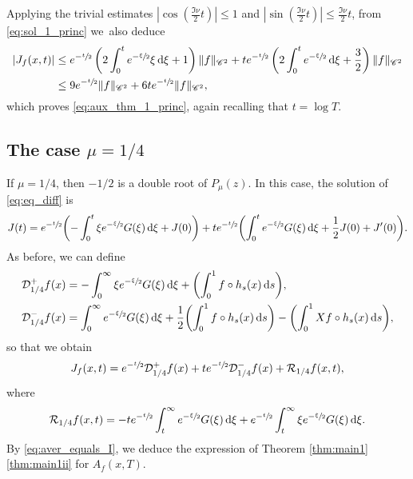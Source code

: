 \documentclass[JEP,XML,SOM,NoEqCountersInSection,Unicode,published]{cedram}
\newcommand*{\diff}{\mathop{}\!\mathrm{d}}
\newcommand{\aver}[1]{A_{#1}(x,T)}
\theoremstyle{definition}
\begin{document}
Applying the trivial estimates $|\cos(\frac{\Im\nu}{2} t)|\leq 1$ and $|\sin(\frac{\Im\nu}{2} t)|\leq \frac{\Im\nu}{2} t$, from \eqref{eq:sol_1_princ} we~also deduce
\begin{equation*}
\begin{split}
|J_f(x,t)|&\leq e^{-\sfrac{t}{2}} \left(2 \int_0^t e^{-\sfrac{\xi}{2}} \xi \diff \xi +1\right) \|f\|_{\mathscr{C}^2} + t e^{-\sfrac{t}{2}} \left(2 \int_0^t e^{-\sfrac{\xi}{2}} \diff \xi +\frac{3}{2}\right) \|f\|_{\mathscr{C}^2}\\
& \leq 9 e^{-\sfrac{t}{2}} \|f\|_{\mathscr{C}^2} + 6t e^{-\sfrac{t}{2}} \|f\|_{\mathscr{C}^2},
\end{split}
\end{equation*}
which proves \eqref{eq:aux_thm_1_princ}, again recalling that $t = \log T$.

\subsection{The case $\mu = 1/4$}\label{sec:14}

If $\mu = 1/4$, then $-1/2$ is a double root of $P_\mu(z)$. In this case, the solution of \eqref{eq:eq_diff} is
\begin{equation*}
J(t) = e^{-\sfrac{t}{2}} \biggl(- \int_0^t \xi e^{-\sfrac{\xi}{2}} G(\xi) \diff \xi + J(0) \biggr) + t e^{-\sfrac{t}{2}} \biggl(\int_0^t e^{-\sfrac{\xi}{2}} G(\xi) \diff \xi + \frac{1}{2} J(0) + J'(0) \biggr).
\end{equation*}
As before, we can define
\begin{equation*}
\begin{split}
&\mathcal{D}_{1/4}^{+}f(x) = - \int_0^\infty \xi e^{-\sfrac{\xi}{2}} G(\xi) \diff \xi + \biggl(\int_0^1 f \circ h_s(x) \diff s \biggr),\\
&\mathcal{D}_{1/4}^{-}f(x) = \int_0^\infty e^{-\sfrac{\xi}{2}} G(\xi) \diff \xi + \frac{1}{2} \biggl(\int_0^1 f \circ h_s(x) \diff s \biggr) - \biggl(\int_0^1 Xf \circ h_s(x) \diff s \biggr),
\end{split}
\end{equation*}
so that we obtain
\begin{equation}\label{eq:I_mu_14}
J_{f}(x,t) = e^{-\sfrac{t}{2}} \mathcal{D}_{1/4}^{+}f(x) + t e^{-\sfrac{t}{2}} \mathcal{D}_{1/4}^{-}f(x) + \mathcal{R}_{1/4}f(x,t),
\end{equation}
where
\[
\mathcal{R}_{1/4}f(x,t) = - t e^{-\sfrac{t}{2}} \int_t^{\infty} e^{-\sfrac{\xi}{2}} G(\xi) \diff \xi + e^{-\sfrac{t}{2}} \int_t^{\infty} \xi e^{-\sfrac{\xi}{2}} G(\xi) \diff \xi.
\]
By \eqref{eq:aver_equals_I}, we deduce the expression of Theorem \ref{thm:main1}\eqref{thm:main1ii} for $\aver{f}$.
\end{document}
